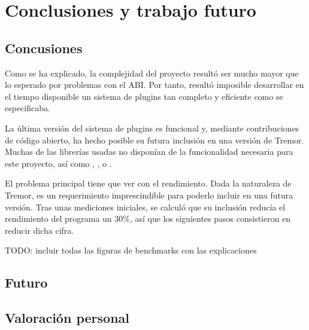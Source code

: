 
\chapter{Conclusiones y trabajo futuro}

\section{Concusiones}

Como se ha explicado, la complejidad del proyecto resultó ser mucho mayor que lo
esperado por problemas con el ABI. Por tanto, resultó imposible desarrollar en
el tiempo disponible un sistema de plugins tan completo y eficiente como se
especificaba.

La última versión del sistema de plugins es funcional y, mediante contribuciones
de código abierto, ha hecho posible su futura inclusión en una versión de
Tremor. Muchas de las librerías usadas no disponían de la funcionalidad
necesaria para este proyecto, así como , ,
 o .

El problema principal tiene que ver con el rendimiento. Dada la naturaleza de
Tremor, es un requerimiento imprescindible para poderlo incluir en una futura
versión. Tras unas mediciones iniciales, se calculó que su inclusión reducía el
rendimiento del programa un 30\%, así que los siguientes pasos consistieron en
reducir dicha cifra.

TODO: incluir todas las figuras de benchmarks con las explicaciones

\section{Futuro}

\section{Valoración personal}
